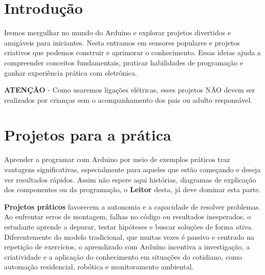 \documentclass[a4paper,11pt]{article}
\begin{document}
\maketitle %
\thispagestyle{fancy} %


\begin{abstract}
\textbf{rduino é uma placa com microcontrolador de baixo custo e alto desempenho que se destaca por seu preço reduzido e por oferecer uma alternativa acessível para projetos de hardware personalizados.}
\end{abstract}

\section{Introdução}
Iremos mergulhar no mundo do Arduino e explorar projetos divertidos e amigáveis para iniciantes. Nesta entramos em sensores populares e projetos criativos que podemos construir e aprimorar o conhecimento. Essas ideias ajuda a compreender conceitos fundamentais, praticar habilidades de programação e ganhar experiência prática com eletrônica.

\textbf{ATENÇÃO} - Como usaremos ligações elétricas, esses projetos NÃO devem ser realizados por crianças sem o acompanhamento dos pais ou adulto responsável.

\section{Projetos para a prática}
Aprender a programar com Arduino por meio de exemplos práticos traz vantagens significativas, especialmente para aqueles que estão começando e deseja ver resultados rápidos. Assim não espere aqui histórias, diagramas de explicação dos componentes ou da programação, o \textbf{Leitor} desta, já deve dominar esta parte.

\textbf{Projetos práticos} favorecem a autonomia e a capacidade de resolver problemas. Ao enfrentar erros de montagem, falhas no código ou resultados inesperados, o estudante aprende a depurar, testar hipóteses e buscar soluções de forma ativa. Diferentemente do modelo tradicional, que muitas vezes é passivo e centrado na repetição de exercícios, o aprendizado com Arduíno incentiva a investigação, a criatividade e a aplicação do conhecimento em situações do cotidiano, como automação residencial, robótica e monitoramento ambiental.
\end{document}
